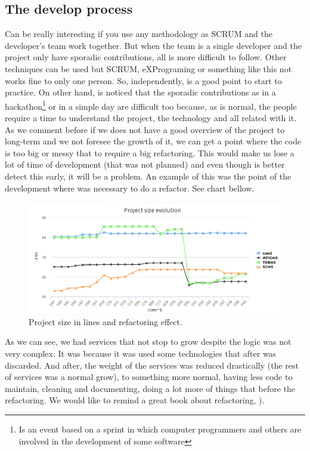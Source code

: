 \subsection{The develop process}

Can be really interesting if you use any methodology as SCRUM and the developer's
team work together. But when the team is a single developer and the project only
have sporadic contributions,
all is more difficult to follow. Other techniques can be used but SCRUM, eXPrograming
or something like this not works fine to only one person.
\intro
So, independently, is a good point to start to practice. On other hand, is
noticed that the sporadic contributions as in a hackathon\footnote{Is an event based on a sprint
in which computer programmers and others are involved in the development of some software} or
in a simple day are difficult too because, as is normal, the people require a time to understand the
project, the technology and all related with it.
\intro
As we comment before if we does not have a good overview of the project to long-term
and we not foresee the growth of it, we can get a point where the code is too big
or messy that to require a big refactoring.
This would make us lose a lot of time of development (that was not planned) and
even though is better detect this early, it will be a problem.
An example of this was the point of the development where was necessary to do a
refactor. See chart bellow.

\begin{figure}[H]
  \includegraphics[scale=0.45]{img/graphics/repository_size.png}
  \centering
  \caption{Project size in lines and refactoring effect.}
\end{figure}

\noindent As we can see, we had services that not stop to grow despite the logic
was not very complex. It was because it was used some technologies that after was
discarded. And after, the weight of the services was reduced drastically (the rest
of services was a normal grow), to something more normal, having less code to
maintain, cleaning and documenting, doing a lot more of things that before the
refactoring. We would like to remind a great book about refactoring, \cite{refactor}).


